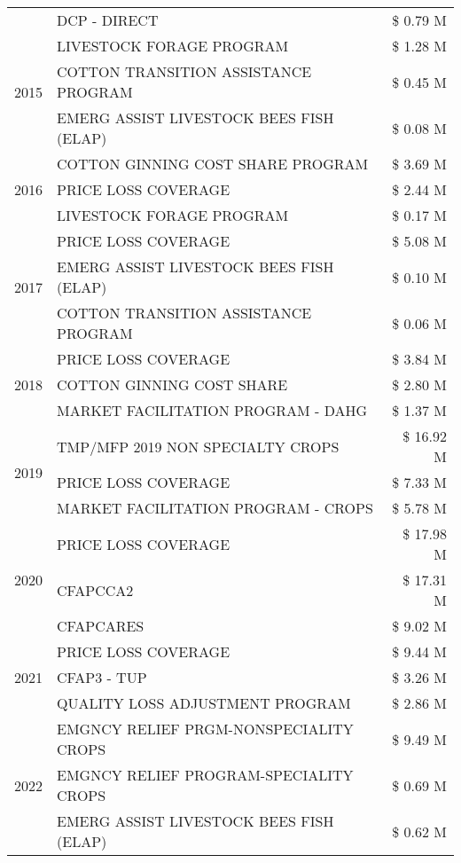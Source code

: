 \begin{tabular}{llr}
 & DCP - DIRECT & \$ 0.79 M \\
\cline{1-3}
\multirow[t]{3}{*}{2015} & LIVESTOCK FORAGE PROGRAM & \$ 1.28 M \\
 & COTTON TRANSITION ASSISTANCE PROGRAM & \$ 0.45 M \\
 & EMERG ASSIST LIVESTOCK BEES FISH (ELAP) & \$ 0.08 M \\
\cline{1-3}
\multirow[t]{3}{*}{2016} & COTTON GINNING COST SHARE PROGRAM & \$ 3.69 M \\
 & PRICE LOSS COVERAGE & \$ 2.44 M \\
 & LIVESTOCK FORAGE PROGRAM & \$ 0.17 M \\
\cline{1-3}
\multirow[t]{3}{*}{2017} & PRICE LOSS COVERAGE & \$ 5.08 M \\
 & EMERG ASSIST LIVESTOCK BEES FISH (ELAP) & \$ 0.10 M \\
 & COTTON TRANSITION ASSISTANCE PROGRAM & \$ 0.06 M \\
\cline{1-3}
\multirow[t]{3}{*}{2018} & PRICE LOSS COVERAGE & \$ 3.84 M \\
 & COTTON GINNING COST SHARE & \$ 2.80 M \\
 & MARKET FACILITATION PROGRAM - DAHG & \$ 1.37 M \\
\cline{1-3}
\multirow[t]{3}{*}{2019} & TMP/MFP 2019 NON SPECIALTY CROPS & \$ 16.92 M \\
 & PRICE LOSS COVERAGE & \$ 7.33 M \\
 & MARKET FACILITATION PROGRAM - CROPS & \$ 5.78 M \\
\cline{1-3}
\multirow[t]{3}{*}{2020} & PRICE LOSS COVERAGE & \$ 17.98 M \\
 & CFAPCCA2 & \$ 17.31 M \\
 & CFAPCARES & \$ 9.02 M \\
\cline{1-3}
\multirow[t]{3}{*}{2021} & PRICE LOSS COVERAGE & \$ 9.44 M \\
 & CFAP3 - TUP & \$ 3.26 M \\
 & QUALITY LOSS ADJUSTMENT PROGRAM & \$ 2.86 M \\
\cline{1-3}
\multirow[t]{3}{*}{2022} & EMGNCY RELIEF PRGM-NONSPECIALITY CROPS & \$ 9.49 M \\
 & EMGNCY RELIEF PROGRAM-SPECIALITY CROPS & \$ 0.69 M \\
 & EMERG ASSIST LIVESTOCK BEES FISH (ELAP) & \$ 0.62 M \\
\cline{1-3}
\bottomrule
\end{tabular}

